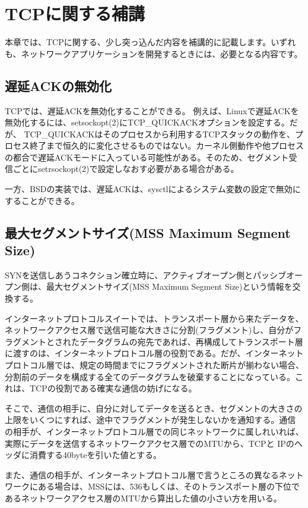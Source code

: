 \chapter{TCPに関する補講}

本章では、TCPに関する、少し突っ込んだ内容を補講的に記載します。いずれも、ネットワークアプリケーションを開発するときには、必要となる内容です。

\section{遅延ACKの無効化}

TCPでは、遅延ACKを無効化することができる。
例えば、Linuxで遅延ACKを無効化するには、setsockopt(2)にTCP\_QUICKACKオプションを設定する。だが、 TCP\_QUICKACKはそのプロセスから利用するTCPスタックの動作を、プロセス終了まで恒久的に変化させるものではない。カーネル側動作や他プロセスの都合で遅延ACKモードに入っている可能性がある。そのため、セグメント受信ごとにsetrsockopt(2)で設定しなおす必要がある場合がある。

一方、BSDの実装では、遅延ACKは、sysctlによるシステム変数の設定で無効にすることができる。

\section{最大セグメントサイズ(MSS Maximum Segment Size)}

SYNを送信しあうコネクション確立時に、アクティブオープン側とパッシブオープン側は、最大セグメントサイズ(MSS Maximum Segment Size)という情報を交換する。

インターネットプロトコルスイートでは、トランスポート層から来たデータを、ネットワークアクセス層で送信可能な大きさに分割(フラグメント)し、自分がフラグメントとされたデータグラムの宛先であれば、再構成してトランスポート層に渡すのは、インターネットプロトコル層の役割である。だが、インターネットプロトコル層では、規定の時間までにフラグメントされた断片が揃わない場合、分割前のデータを構成する全てのデータグラムを破棄することになっている。これは、TCPの役割である確実な通信の妨げになる。

そこで、通信の相手に、自分に対してデータを送るとき、セグメントの大きさの上限をいくつにすれば、途中でフラグメントが発生しないかを通知する。通信の相手が、インターネットプロトコル層での同じネットワークに属しれいれば、実際にデータを送信するネットワークアクセス層でのMTUから、TCPと IPのヘッダに消費する40byteを引いた値とする。

また、通信の相手が、インターネットプロトコル層で言うところの異なるネットワークにある場合は、MSSには、536もしくは、そのトランスポート層の下位であるネットワークアクセス層のMTUから算出した値の小さい方を用いる。

